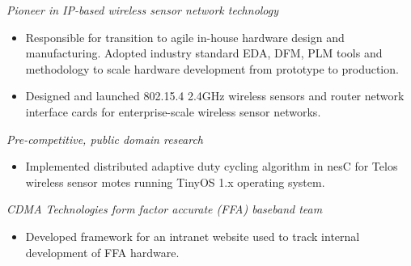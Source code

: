 \documentclass[11pt,a4paper]{moderncv}
\begin{document}
{
  \textit{Pioneer in IP-based wireless sensor network technology}
  \begin{itemize}
    \item Responsible for transition to agile in-house hardware design and manufacturing.  Adopted industry standard EDA, DFM, PLM tools and methodology to scale hardware development from prototype to production.
    \item Designed and launched 802.15.4 2.4GHz  wireless sensors and router network interface cards for enterprise-scale wireless sensor networks.
  \end{itemize}
}
{
  \textit{Pre-competitive, public domain research}
  \begin{itemize}
    \item Implemented distributed adaptive duty cycling algorithm in nesC for Telos wireless sensor motes running TinyOS 1.x operating system.
  \end{itemize}
}
{
  \textit{CDMA Technologies form factor accurate (FFA) baseband team}
  \begin{itemize}
    \item Developed framework for an intranet website used to track internal development of FFA hardware.
  \end{itemize}
}
\end{document}
